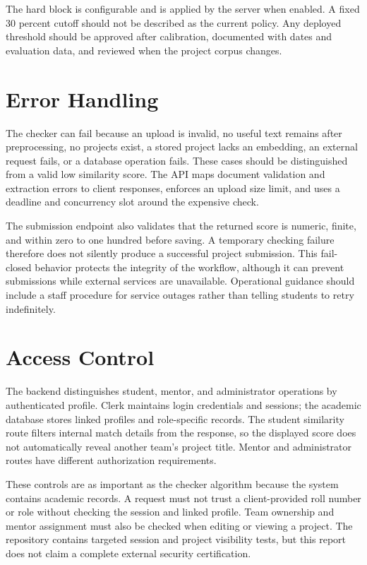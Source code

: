 \documentclass[12pt,a4paper]{report}
\begin{document}
The hard block is configurable and is applied by the server when enabled. A fixed 30 percent cutoff should not be described as the current policy. Any deployed threshold should be approved after calibration, documented with dates and evaluation data, and reviewed when the project corpus changes.

\section{Error Handling}
The checker can fail because an upload is invalid, no useful text remains after preprocessing, no projects exist, a stored project lacks an embedding, an external request fails, or a database operation fails. These cases should be distinguished from a valid low similarity score. The API maps document validation and extraction errors to client responses, enforces an upload size limit, and uses a deadline and concurrency slot around the expensive check.

The submission endpoint also validates that the returned score is numeric, finite, and within zero to one hundred before saving. A temporary checking failure therefore does not silently produce a successful project submission. This fail-closed behavior protects the integrity of the workflow, although it can prevent submissions while external services are unavailable. Operational guidance should include a staff procedure for service outages rather than telling students to retry indefinitely.


\section{Access Control}
The backend distinguishes student, mentor, and administrator operations by authenticated profile. Clerk maintains login credentials and sessions; the academic database stores linked profiles and role-specific records. The student similarity route filters internal match details from the response, so the displayed score does not automatically reveal another team's project title. Mentor and administrator routes have different authorization requirements.

These controls are as important as the checker algorithm because the system contains academic records. A request must not trust a client-provided roll number or role without checking the session and linked profile. Team ownership and mentor assignment must also be checked when editing or viewing a project. The repository contains targeted session and project visibility tests, but this report does not claim a complete external security certification.
\end{document}
